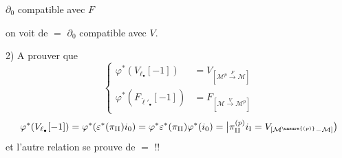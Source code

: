 $\partial_0$ compatible avec $F$

on voit de $=$ $\partial_0$ compatible avec $V$.

2) A prouver que
\[
\left\{\begin{aligned}
\varphi^*(V_{\ell_{\bullet}}[-1])&=V_{[\mathcal M^{p}\xrightarrow{F}\mathcal M]}\\
\varphi^*(F_{\check\ell'_{\bullet}}[-1])&=F_{[\mathcal M\xrightarrow{V}\mathcal M^p]}
\end{aligned}\right.
\]
\[
\varphi^*(V_{\ell_{\bullet}}[-1])=\varphi^*(\varepsilon^*(\pi_{\mathrm {II}})i_0)
=\varphi^*\varepsilon^*(\pi_{\mathrm {II}})\varphi^*(i_0)
=\big|\pi_{\mathrm {II}}^{(p)}i_{\mathrm I}=V_{[\mathcal M^{\unsure{(p)}}\mathbin{-}\mathcal M]}\big)
\]
et l'autre relation se prouve de $=$ !!
